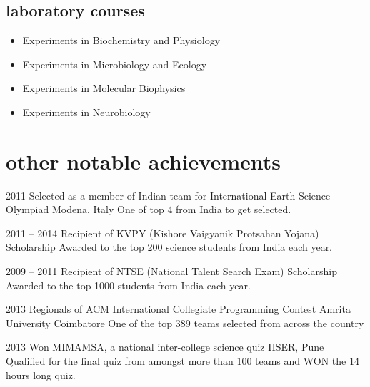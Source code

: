 \documentclass[11pt]{friggeri-cv}%
\begin{document}
\begin{multicols}{2}[]
\begin{minipage}{1.05\columnwidth}
\subsection{laboratory courses}
\begin{itemize}
\item Experiments in Biochemistry and Physiology
\item Experiments in Microbiology and Ecology
\item Experiments in Molecular Biophysics
\item Experiments in Neurobiology
\end{itemize}



\end{minipage}

\end{multicols}



\section{other notable achievements}

\begin{entrylist}
  \entryy
    {2011}
    {Selected as a member of Indian team for International Earth Science Olympiad}
    {Modena, Italy}
    {One of top 4 from India to get selected.}
\end{entrylist}


\begin{entrylist}
  \entryy
    {2011 -- 2014}
    {Recipient of KVPY (Kishore Vaigyanik Protsahan Yojana) Scholarship}{}
    {Awarded to the top 200 science students from India each year.}

\end{entrylist}


\begin{entrylist}
  \entryy
    {2009 -- 2011}
    {Recipient of NTSE (National Talent Search Exam) Scholarship}{}
    {Awarded to the top 1000 students from India each year.}
\end{entrylist}


\begin{entrylist}
  \entryy
    {2013}
    {Regionals of ACM International Collegiate Programming Contest}
    {Amrita University Coimbatore}
    {One of the top 389 teams selected from across the country}
\end{entrylist}


\begin{entrylist}
  \entryy
    {2013}
    {Won MIMAMSA, a national inter-college science quiz}
    {IISER, Pune}
    {Qualified for the final quiz from amongst more than 100 teams and WON the 14 hours long quiz.}
\end{entrylist}
\end{document}
